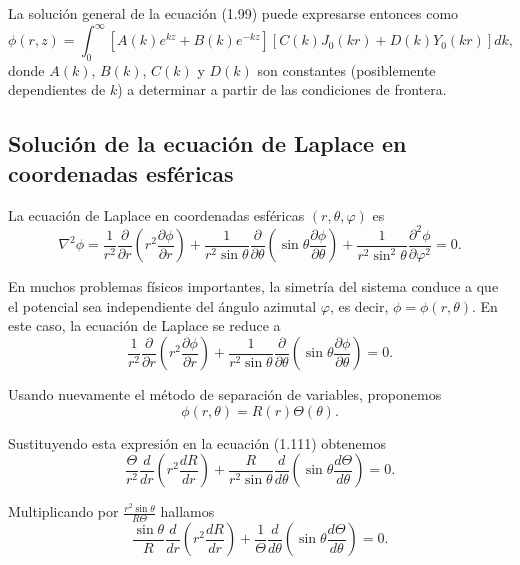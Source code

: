 \documentclass[12pt,a4paper]{book}
\begin{document}
La solución general de la ecuación (1.99) puede expresarse entonces como
\begin{equation}
\phi(r, z) = \int_{0}^{\infty} \left[A(k)e^{kz} + B(k)e^{-kz}\right]\left[C(k)J_0(kr) + D(k)Y_0(kr)\right]dk,
\end{equation}
donde $A(k)$, $B(k)$, $C(k)$ y $D(k)$ son constantes (posiblemente dependientes de $k$) a determinar a partir de las condiciones de frontera.

\subsection{Solución de la ecuación de Laplace en coordenadas esféricas}

La ecuación de Laplace en coordenadas esféricas $(r, \theta, \varphi)$ es
\begin{equation}
\nabla^2\phi = \frac{1}{r^2}\frac{\partial}{\partial r}\left(r^2\frac{\partial \phi}{\partial r}\right) + \frac{1}{r^2\sin\theta}\frac{\partial}{\partial\theta}\left(\sin\theta\frac{\partial\phi}{\partial\theta}\right) + \frac{1}{r^2\sin^2\theta}\frac{\partial^2\phi}{\partial\varphi^2} = 0.
\end{equation}

En muchos problemas físicos importantes, la simetría del sistema conduce a que el potencial sea independiente del ángulo azimutal $\varphi$, es decir, $\phi = \phi(r, \theta)$. En este caso, la ecuación de Laplace se reduce a
\begin{equation}
\frac{1}{r^2}\frac{\partial}{\partial r}\left(r^2\frac{\partial \phi}{\partial r}\right) + \frac{1}{r^2\sin\theta}\frac{\partial}{\partial\theta}\left(\sin\theta\frac{\partial\phi}{\partial\theta}\right) = 0.
\end{equation}

Usando nuevamente el método de separación de variables, proponemos
\begin{equation}
\phi(r, \theta) = R(r)\Theta(\theta).
\end{equation}

Sustituyendo esta expresión en la ecuación (1.111) obtenemos
\begin{equation}
\frac{\Theta}{r^2}\frac{d}{dr}\left(r^2\frac{dR}{dr}\right) + \frac{R}{r^2\sin\theta}\frac{d}{d\theta}\left(\sin\theta\frac{d\Theta}{d\theta}\right) = 0.
\end{equation}

Multiplicando por $\frac{r^2\sin\theta}{R\Theta}$ hallamos
\begin{equation}
\frac{\sin\theta}{R}\frac{d}{dr}\left(r^2\frac{dR}{dr}\right) + \frac{1}{\Theta}\frac{d}{d\theta}\left(\sin\theta\frac{d\Theta}{d\theta}\right) = 0.
\end{equation}
\end{document}
